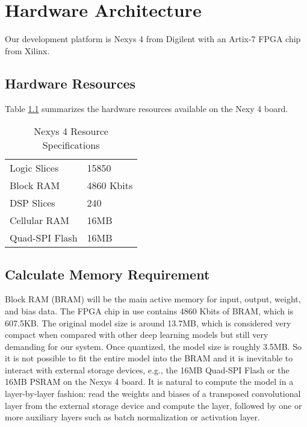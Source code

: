
\chapter{Hardware Architecture}

Our development platform is Nexys 4 from Digilent with an Artix-7 FPGA chip from Xilinx.

\section{Hardware Resources}

Table \ref{table:hardware_resources} summarizes the hardware resources available on the Nexy 4 board.

\begin{table}[h]
  \centering
  \caption{Nexys 4 Resource Specifications}
  \begin{tabular}{l | l}
    Logic Slices & 15850 \\
    Block RAM & 4860 Kbits \\
    DSP Slices & 240 \\
    Cellular RAM & 16MB \\
    Quad-SPI Flash & 16MB
  \end{tabular}
  \label{table:hardware_resources}
\end{table}

\section{Calculate Memory Requirement}

Block RAM (BRAM) will be the main active memory for input, output, weight, and bias data. The FPGA chip in use
contains 4860 Kbits of BRAM, which is 607.5KB. The original model size is around 13.7MB, which is
considered very compact when compared with other deep learning models but still very demanding for
our system. Once quantized, the model size is roughly 3.5MB. So it is not possible to fit the entire model
into the BRAM and it is inevitable to interact with external storage devices, e.g., the 16MB Quad-SPI Flash
or the 16MB PSRAM on the Nexys 4 board. It is natural to compute the model in a layer-by-layer fashion: read
the weights and biases of a transposed convolutional layer from the external storage device and compute the
layer, followed by one or more auxiliary layers such as batch normalization or activation layer.

